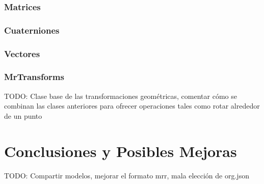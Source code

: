 \subsubsection{Matrices}
\subsubsection{Cuaterniones}
\subsubsection{Vectores}
\subsubsection{MrTransforms}
TODO: Clase base de las transformaciones geométricas, comentar cómo se combinan las clases anteriores para ofrecer operaciones tales como rotar alrededor de un punto




\section{Conclusiones y Posibles Mejoras}

TODO: Compartir modelos, mejorar el formato mrr, mala elección de org.json